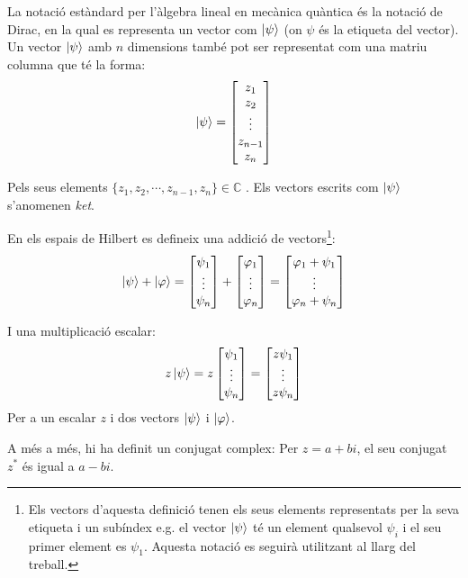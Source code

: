 La notació estàndard per l'àlgebra lineal en mecànica quàntica és la notació de Dirac, en la qual es representa un vector com $ \ket{\psi} $ (on $\psi$ és la etiqueta del vector). Un vector $ \ket{\psi} $ amb $n$ dimensions també pot ser representat com una matriu columna que té la forma: 
$$
\ket{\psi} = 
\begin{bmatrix}
	z_{1} \\
	z_{2} \\
	\vdots \\
	z_{n-1} \\
	z_{n}
\end{bmatrix}
$$

Pels seus elements $\{z_{1}, z_{2}, \cdots , z_{n-1}, z_{n}\} \in \mathbb{C}$ . Els vectors escrits com $\ket{\psi}$ s'anomenen \textit{ket}.

En els espais de Hilbert es defineix una addició de vectors\footnote{Els vectors d'aquesta definició tenen els seus elements representats per la seva etiqueta i un subíndex e.g. el vector $\ket{\psi}$ té un element qualsevol $\psi_{i}$ i el seu primer element es $\psi_{1}$. Aquesta notació es seguirà utilitzant al llarg del treball.}:
$$
\ket{\psi} + \ket{\varphi} = \begin{bmatrix} \psi_{1} \\ \vdots \\ \psi_{n} \end{bmatrix} +
\begin{bmatrix} \varphi_{1} \\ \vdots \\ \varphi_{n} \end{bmatrix} = 
\begin{bmatrix} \varphi_{1} + \psi_{1} \\ \vdots \\ \varphi_{n} + \psi_{n} \end{bmatrix}
$$

I una multiplicació escalar:
$$
  z\ket{\psi} = z\begin{bmatrix} \psi_{1} \\ \vdots \\ \psi_{n} \end{bmatrix} = \begin{bmatrix} z \psi_{1} \\ \vdots \\ z \psi_{n} \end{bmatrix}
$$
Per a un escalar $z$ i dos vectors $\ket{\psi}$ i $\ket{\varphi}$.

A més a més, hi ha definit un conjugat complex: Per $z=a +bi$, el seu conjugat $z^*$ és igual a $a-bi$. 

